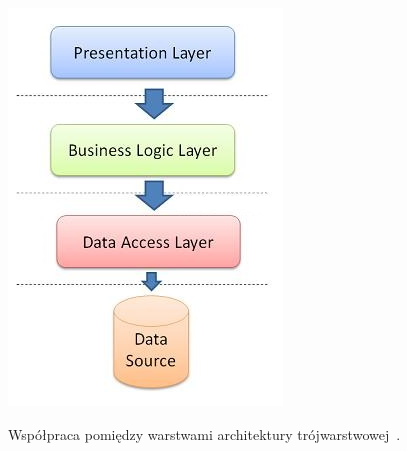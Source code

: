 \begin{figure}[!ht]
 \begin{center}
  \scalebox{0.7}
  {
   \includegraphics{figures/generated_app_type/three_tier.png}
  }
 \end{center}
 \caption{Współpraca pomiędzy warstwami architektury trójwarstwowej~\cite{three_tier}.}
 \label{fig:three_tier}
\end{figure}
